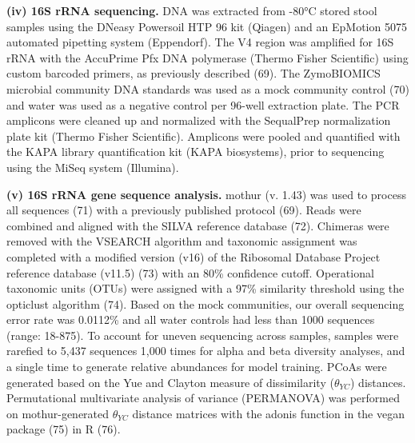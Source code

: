 \documentclass[
  11pt,
]{article}
\begin{document}
\textbf{(iv) 16S rRNA sequencing.} DNA was extracted from -80°C stored
stool samples using the DNeasy Powersoil HTP 96 kit (Qiagen) and an
EpMotion 5075 automated pipetting system (Eppendorf). The V4 region was
amplified for 16S rRNA with the AccuPrime Pfx DNA polymerase (Thermo
Fisher Scientific) using custom barcoded primers, as previously
described (69). The ZymoBIOMICS microbial community DNA standards was
used as a mock community control (70) and water was used as a negative
control per 96-well extraction plate. The PCR amplicons were cleaned up
and normalized with the SequalPrep normalization plate kit (Thermo
Fisher Scientific). Amplicons were pooled and quantified with the KAPA
library quantification kit (KAPA biosystems), prior to sequencing using
the MiSeq system (Illumina).

\textbf{(v) 16S rRNA gene sequence analysis.} mothur (v. 1.43) was used
to process all sequences (71) with a previously published protocol (69).
Reads were combined and aligned with the SILVA reference database (72).
Chimeras were removed with the VSEARCH algorithm and taxonomic
assignment was completed with a modified version (v16) of the Ribosomal
Database Project reference database (v11.5) (73) with an 80\% confidence
cutoff. Operational taxonomic units (OTUs) were assigned with a 97\%
similarity threshold using the opticlust algorithm (74). Based on the
mock communities, our overall sequencing error rate was 0.0112\% and all
water controls had less than 1000 sequences (range: 18-875). To account
for uneven sequencing across samples, samples were rarefied to 5,437
sequences 1,000 times for alpha and beta diversity analyses, and a
single time to generate relative abundances for model training. PCoAs
were generated based on the Yue and Clayton measure of dissimilarity
(\(\theta_{YC}\)) distances. Permutational multivariate analysis of
variance (PERMANOVA) was performed on mothur-generated \(\theta_{YC}\)
distance matrices with the adonis function in the vegan package (75) in
R (76).
\end{document}
